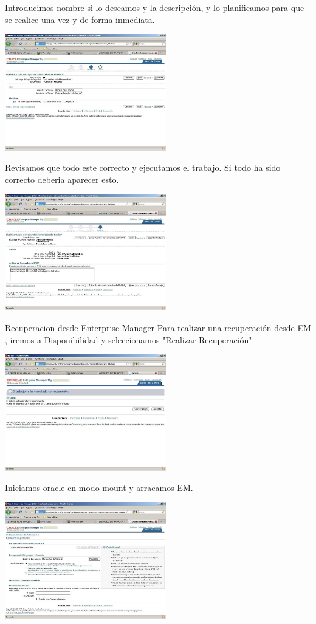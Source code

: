 \documentclass[a4paper,twocolumn,10pt]{article}
\begin{document}
 Introducimos nombre si lo deseamos y la descripci\'on, y lo planificamos para que se realice una vez y de forma inmediata.
\begin{center}
\includegraphics[width=7cm]{./Imagenes/eje3.jpg}
\end{center}
Revisamos que todo este correcto y ejecutamos el trabajo. Si todo ha sido correcto deberia aparecer esto.\\
\begin{center}
\includegraphics[width=7cm]{./Imagenes/eje4.jpg}
\end{center}
Recuperacion desde Enterprise Manager
Para realizar una recuperaci\'on desde EM , iremos a Disponibilidad y seleccionamos "Realizar Recuperaci\'on".\\
\begin{center}
\includegraphics[width=7cm]{./Imagenes/eje5.jpg}
\end{center}
Iniciamos oracle en modo mount y arracamos EM.\\
\begin{center}
\includegraphics[width=7cm]{./Imagenes/eje6.jpg}
\end{center}
\end{document}
